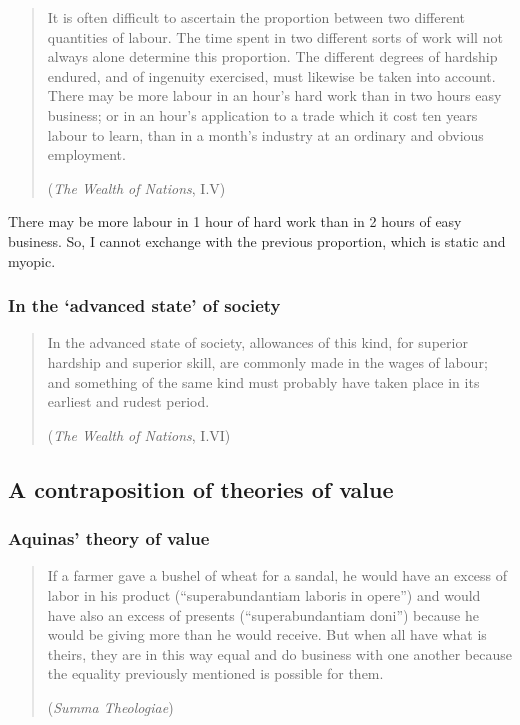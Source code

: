             \begin{quote}
                It is often difficult to ascertain the proportion between two different quantities of labour. The time spent in two different sorts of work will not always alone determine this proportion. The different degrees of hardship endured, and of ingenuity exercised, must likewise be taken into account. There may be more labour in an hour’s hard work than in two hours easy business; or in an hour’s application to a trade which it cost ten years labour to learn, than in a month’s industry at an ordinary and obvious employment.

                (\textit{The Wealth of Nations}, I.V)
            \end{quote}

            \begin{remark}
                There may be more labour in 1 hour of hard work than in 2 hours of easy business. So, I cannot exchange with the previous proportion, which is static and myopic. 
            \end{remark}

        \subsubsection{In the ‘advanced state’ of society}

            \begin{quote}
                In the advanced state of society, allowances of this kind, for superior hardship and superior skill, are commonly made in the wages of labour; and something of the same kind must probably have taken place in its earliest and rudest period.

                (\textit{The Wealth of Nations}, I.VI)
            \end{quote} 

    \subsection{A contraposition of theories of value}

        \subsubsection{Aquinas’ theory of value}

            \begin{quote}
                If a farmer gave a bushel of wheat for a sandal, he would have an excess of labor in his product (“superabundantiam laboris in opere”) and would have also an excess of presents (“superabundantiam doni”) because he would be giving more than he would receive. But when all have what is theirs, they are in this way equal and do business with one another because the equality previously mentioned is possible for them.

                (\textit{Summa Theologiae})
            \end{quote}

